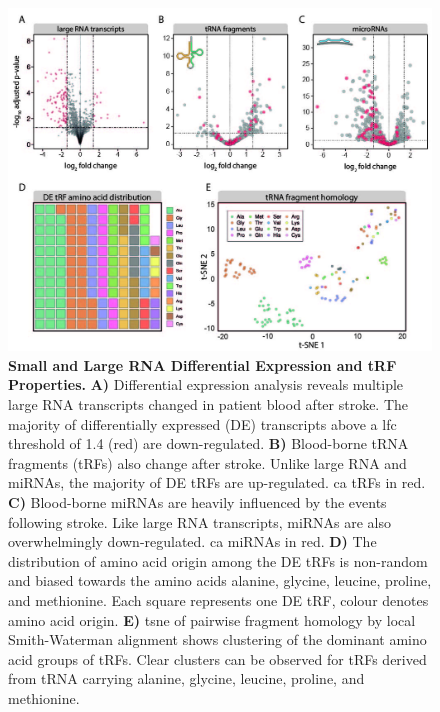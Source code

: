 \begin{figure}[ht!]
\includegraphics[width=\textwidth]{figures/stroke-de-tsne}
\caption[Small and Large RNA Differential Expression and tRF Properties.]{\textbf{Small and Large RNA Differential Expression and tRF Properties.} \textbf{A)} Differential expression analysis reveals multiple large RNA transcripts changed in patient blood after stroke. The majority of differentially expressed (DE) transcripts above a \ac{lfc} threshold of 1.4 (red) are down-regulated. \textbf{B)} Blood-borne tRNA fragments (tRFs) also change after stroke. Unlike large RNA and miRNAs, the majority of DE tRFs are up-regulated. \Acf{ca} tRFs in red. \textbf{C)} Blood-borne miRNAs are heavily influenced by the events following stroke. Like large RNA transcripts, miRNAs are also overwhelmingly down-regulated. \Ac{ca} miRNAs in red. \textbf{D)} The distribution of amino acid origin among the DE tRFs is non-random and biased towards the amino acids alanine, glycine, leucine, proline, and methionine. Each square represents one DE tRF, colour denotes amino acid origin. \textbf{E)} \acf{tsne} of pairwise fragment homology by local Smith-Waterman alignment shows clustering of the dominant amino acid groups of tRFs. Clear clusters can be observed for tRFs derived from tRNA carrying alanine, glycine, leucine, proline, and methionine.
\label{fig:stroke-de-tsne}}
\end{figure}

